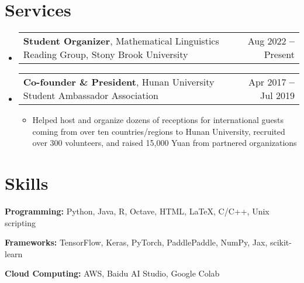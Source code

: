 \documentclass[letterpaper,11pt]{article}
\makeatletter
\newcommand{\resumeItem}[1]{
  \item\small{
    {#1 \vspace{-2pt}}
  }
}
\newcommand{\resumeProjectHeading}[2]{
    \vspace{-2pt}\item
    \begin{tabular*}{0.97\textwidth}{l@{\extracolsep{\fill}}r}
      \small#1 & #2 \\
    \end{tabular*}\vspace{-7pt}
}
\newcommand{\resumeSubHeadingListStart}{\begin{itemize}[leftmargin=0.15in, label={}]}
\newcommand{\resumeSubHeadingListEnd}{\end{itemize}}
\newcommand{\resumeItemListStart}{\begin{itemize}}
\newcommand{\resumeItemListEnd}{\end{itemize}\vspace{-5pt}}
\makeatother
\begin{document}

\section{Services}
    \resumeSubHeadingListStart
    \resumeProjectHeading
        {\textbf{Student Organizer}, Mathematical Linguistics Reading Group, Stony Brook University}{Aug 2022 \textbf{--} Present}

    \resumeProjectHeading        
    	 {\textbf{Co-founder \& President}, Hunan University Student Ambassador Association}{Apr 2017 \textbf{--} Jul 2019 }
          \resumeItemListStart
            \resumeItem{Helped host and organize dozens of receptions for international guests coming from over ten countries/regions to Hunan University, recruited over 300 volunteers, and raised 15,000 Yuan from partnered organizations}
          \resumeItemListEnd

    \resumeSubHeadingListEnd

\vspace{-20pt}


\section{Skills}
  \resumeSubHeadingListStart
    \small{\item{
        \textbf{Programming:}{ Python, Java, R, Octave, HTML, \LaTeX, C/C++, Unix scripting} \\ \vspace{2pt}
        
        \textbf{Frameworks:}{ TensorFlow, Keras, PyTorch, PaddlePaddle, NumPy, Jax, scikit-learn} \\ \vspace{2pt}
        
        \textbf{Cloud Computing:}{ AWS, Baidu AI Studio, Google Colab}
    }} \\ \vspace{-5pt}
  \resumeSubHeadingListEnd


\end{document}
